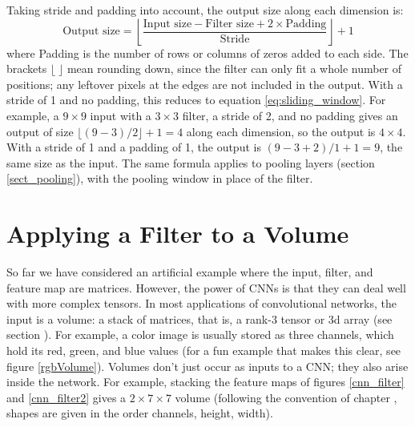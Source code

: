 Taking stride and padding into account, the output size along each dimension is:
\begin{equation}\label{eq:sliding_window_general}
\text{Output size} = \left\lfloor \frac{\text{Input size} - \text{Filter size} + 2 \times \text{Padding}}{\text{Stride}} \right\rfloor + 1
\end{equation}
where Padding is the number of rows or columns of zeros added to each side. The brackets $\lfloor \; \rfloor$ mean rounding down, since the filter can only fit a whole number of positions; any leftover pixels at the edges are not included in the output. With a stride of 1 and no padding, this reduces to equation \ref{eq:sliding_window}. For example, a $9 \times 9$ input with a $3 \times 3$ filter, a stride of 2, and no padding gives an output of size $\lfloor (9 - 3)/2 \rfloor + 1 = 4$ along each dimension, so the output is $4 \times 4$. With a stride of 1 and a padding of 1, the output is $(9 - 3 + 2)/1 + 1 = 9$, the same size as the input. The same formula applies to pooling layers (section \ref{sect_pooling}), with the pooling window in place of the filter.

\section{Applying a Filter to a Volume}\label{sect_filterVolume}

So far we have considered an artificial example where the input, filter, and feature map are matrices. However, the power of CNNs is that they can deal well with more complex tensors. In most applications of convolutional networks, the input is a volume: a stack of matrices, that is, a rank-3 tensor or 3d array (see section ). For example, a color image is usually stored as three channels, which hold its red, green, and blue values (for a fun example that makes this clear, see figure \ref{rgbVolume}). Volumes don't just occur as inputs to a CNN; they also arise inside the network. For example, stacking the feature maps of figures \ref{cnn_filter} and \ref{cnn_filter2} gives a $2 \times 7 \times 7$ volume (following the convention of chapter , shapes are given in the order channels, height, width).

